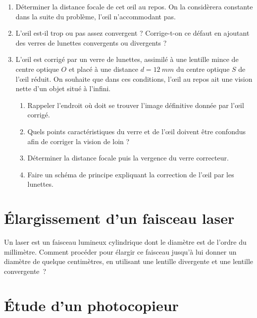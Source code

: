 \documentclass[a4paper, 12pt, final, garamond]{book}
\begin{document}
\begin{enumerate}
    \item Déterminer la distance focale de cet œil au repos. On la considèrera
        constante dans la suite du problème, l'œil n'accommodant pas.
    \item L'œil est-il trop ou pas assez convergent ? Corrige-t-on ce défaut en
        ajoutant des verres de lunettes convergents ou divergents ?
    \item L'œil est corrigé par un verre de lunettes, assimilé à une lentille
        mince de centre optique $O$ et
        placé à une distance $d = \SI{12}{mm}$ du centre optique $S$ de l'œil
        réduit. On souhaite que dans ces conditions, l'œil au repos ait une
        vision nette d'un objet situé à l'infini.
        \begin{enumerate}
            \item Rappeler l'endroit où doit se trouver l'image définitive
                donnée par l'œil corrigé.
            \item Quels points caractéristiques du verre et de l'œil doivent
                être confondus afin de corriger la vision de loin ?
            \item Déterminer la distance focale puis la vergence du verre
                correcteur.
            \item Faire un schéma de principe expliquant la correction de l'œil
                par les lunettes.
        \end{enumerate}
\end{enumerate}

\section{Élargissement d'un faisceau laser}
Un laser est un faisceau lumineux cylindrique dont le diamètre est de l'ordre du
millimètre. Comment procéder pour élargir ce faisceau jusqu'à lui donner un
diamètre de quelque centimètres, en utilisant une lentille divergente et une
lentille convergente~?

\section{Étude d'un photocopieur}
\end{document}

